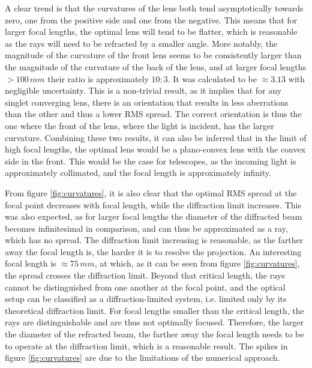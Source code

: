\documentclass{article}
\begin{document}
A clear trend is that the curvatures of the lens both tend asymptotically towards zero, one from the positive side and one from the negative. This means that for larger focal lengths, the optimal lens will tend to be flatter, which is reasonable as the rays will need to be refracted by a smaller angle. More notably, the magnitude of the curvature of the front lens seems to be consistently larger than the magnitude of the curvature of the back of the lens, and at larger focal lengths $>100\,mm$ their ratio is approximately $10:3$. It was calculated to be $\approx 3.13$ with negligible uncertainty. This is a non-trivial result, as it implies that for any singlet converging lens, there is an orientation that results in less aberrations than the other and thus a lower RMS spread. The correct orientation is thus the one where the front of the lens, where the light is incident, has the larger curvature. Combining these two results, it can also be inferred that in the limit of high focal lengths, the optimal lens would be a plano-convex lens with the convex side in the front. This would be the case for telescopes, as the incoming light is approximately collimated, and the focal length is approximately infinity.

From figure \ref{fig:curvatures}, it is also clear that the optimal RMS spread at the focal point decreases with focal length, while the diffraction limit increases. This was also expected, as for larger focal lengths the diameter of the diffracted beam becomes infinitesimal in comparison, and can thus be approximated as a ray, which has no spread. The diffraction limit increasing is reasonable, as the farther away the focal length is, the harder it is to resolve the projection. An interesting focal length is $\approx75\,mm$, at which, as it can be seen from figure \ref{fig:curvatures}, the spread crosses the diffraction limit. Beyond that critical length, the rays cannot be distinguished from one another at the focal point, and the optical setup can be classified as a diffraction-limited system, i.e. limited only by its theoretical diffraction limit. For focal lengths smaller than the critical length, the rays are distinguishable and are thus not optimally focused. Therefore, the larger the diameter of the refracted beam, the farther away the focal length needs to be to operate at the diffraction limit, which is a reasonable result. The spikes in figure \ref{fig:curvatures} are due to the limitations of the numerical approach.
\end{document}
